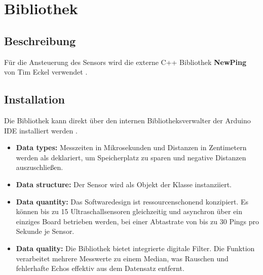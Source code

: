 \section{Bibliothek}

\subsection{Beschreibung}                                                                                                 
Für die Ansteuerung des Sensors wird die externe C++ Bibliothek \textbf{NewPing} von Tim Eckel verwendet \cite{Eckel:2023}.

\subsection{Installation}                                                                                            
Die Bibliothek kann direkt über den internen Bibliotheksverwalter der Arduino IDE installiert werden \cite{Eckel:2023}.
\begin{itemize}                                                                                                                                                                                   
	\item \textbf{Data types:} Messzeiten in Mikrosekunden und Distanzen in Zentimetern werden als  deklariert, um Speicherplatz zu sparen und negative Distanzen auszuschlie\ss en.
	\item \textbf{Data structure:} Der Sensor wird als Objekt der Klasse  instanziiert.                                                                                                                                                            
	\item \textbf{Data quantity:} Das Softwaredesign ist ressourcenschonend konzipiert. Es können bis zu 15 Ultraschallsensoren gleichzeitig und asynchron über ein einziges Board betrieben werden, bei einer Abtastrate von bis zu 30 Pings pro Sekunde je Sensor.
	\item \textbf{Data quality:} Die Bibliothek bietet integrierte digitale Filter. Die Funktion  verarbeitet mehrere Messwerte zu einem Median, was Rauschen und fehlerhafte Echos effektiv aus dem Datensatz entfernt.
\end{itemize}

